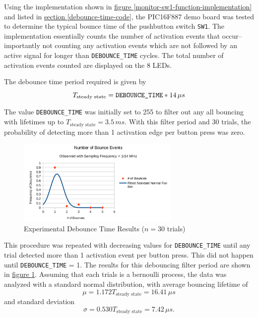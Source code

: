 \documentclass[11pt]{article}
\begin{document}
Using the implementation shown in
\hyperref[monitor-sw1-function-implementation]{figure \ref{monitor-sw1-function-implementation}}
and listed in
\hyperref[debounce-time-code]{section \ref{debounce-time-code}},
the PIC16F887 demo board was tested to determine the typical bounce time of
the pushbutton switch \texttt{SW1}. The implementation essentially counts the
number of activation events that occur--importantly not counting any activation events
which are not followed by an active signal for longer than \texttt{DEBOUNCE\_TIME} cycles.
The total number of activation events counted are displayed on the 8 LEDs.

The debounce time period required is given by
\begin{equation*}
T_{\textrm{steady state}}=\textrm{\texttt{DEBOUNCE\_TIME}}*14\,\mu s
\end{equation*}

The value \texttt{DEBOUNCE\_TIME} was initially set to 255 to filter out any
all bouncing with lifetimes up to $T_{\textrm{steady state}}=3.5\,ms$.
With this filter period and 30 trials, the probability of
detecting more than 1 activation edge per button press was zero.

\begin{figure}
	\centering
	\includegraphics[width=0.7\textwidth]{Figures/debounce-time-results.pdf}
	\caption{Experimental Debounce Time Results ($n=30$ trials)}
	\label{debounce-time-results}
\end{figure}

This procedure was repeated with decreasing values for \texttt{DEBOUNCE\_TIME}
until any trial detected more than 1 activation event per button press.
This did not happen until \texttt{DEBOUNCE\_TIME} = 1.
The results for this debouncing filter period
are shown in \hyperref[debounce-time-results]{figure \ref{debounce-time-results}}.
Assuming that each trials is a bernoulli process, the data was
analyzed with a standard normal distribution, with average bouncing lifetime of
\begin{equation*}
\mu=1.172T_{\textrm{steady state}}=16.41\,\mu s
\end{equation*}
and standard deviation
\begin{equation*}
\sigma=0.530T_{\textrm{steady state}}=7.42\,\mu s.
\end{equation*}
\end{document}

